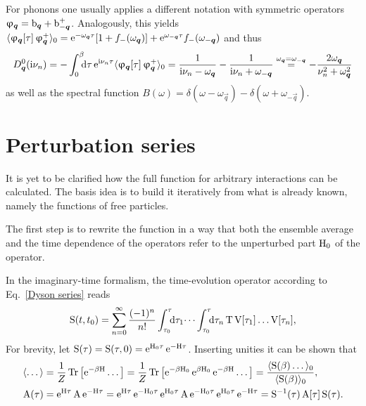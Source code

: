 For phonons one usually applies a different notation with symmetric operators
$\upvarphi_{\boldsymbol q} = \mathrm b_{\boldsymbol q} + \mathrm b_{-\boldsymbol q}^+$. Analogously, this yields
$\langle\upvarphi_{\boldsymbol q}[\tau] \, \upvarphi_{\boldsymbol q}^+\rangle_0 = \mathrm e^{-\omega_{\boldsymbol q} \tau}
[1 + f_-(\omega_{\boldsymbol q})] + \mathrm e^{\omega_{-\boldsymbol q} \tau} f_-(\omega_{-\boldsymbol q})$
and thus
%
\begin{equation} \label{D_0(i omega_n)}
    D_{\vec q}^0(\I \nu_n)
    = -\int \from 0 \till \beta \D \tau \, \E^{\I \nu_n \tau}
    \av{\upphi_{\vec q}[\tau] \, \upphi_{\vec q}^+}_0
    = \frac 1 {\I \nu_n - \omega_{\vec q}}
    - \frac 1 {\I \nu_n + \omega_{-\vec q}}
    \overset{\omega_{\vec q} = \omega_{-\vec q}} =
    -\frac{2 \omega_{\vec q}}{\nu_n^2 + \omega_{\vec q}^2}
\end{equation}
%
as well as the spectral function $B(\omega) = \delta(\omega - \omega_{\vec q}) -
\delta(\omega + \omega_{-\vec q})$.

\section{Perturbation series}

It is yet to be clarified how the full  function for arbitrary
interactions can be calculated. The basis idea is to build it iteratively from
what is already known, namely the  functions of free particles.

The first step is to rewrite the  function in a way that both the
ensemble average and the time dependence of the operators refer to the
unperturbed part $\mathrm H_0$ of the  operator.

In the imaginary-time formalism, the time-evolution operator according to
Eq.~\ref{Dyson series} reads
%
\begin{equation} \label{Matsubara-Dyson series}
    \op S(t, t_0) = \sum_{n = 0}^\infty \frac{(-1)^n}{n!}
    \int \from{\tau_0} \till \tau \D \tau_1 \dots
    \int \from{\tau_0} \till \tau \D \tau_n \,
    \op T \, \op V[\tau_1] \dots \op V[\tau_n],
\end{equation}
%
For brevity, let $\mathrm S(\tau) = \mathrm S(\tau, 0) = \mathrm e^{\mathrm H_0 \tau} \, \mathrm e^{-\mathrm H
\tau}$. Inserting unities it can be shown that
%
\begin{align*}
    \langle\dots\rangle &= \frac 1 Z \operatorname{Tr} \big[ \mathrm e^{-\beta \mathrm H} \dots \big]
    = \frac 1 Z \operatorname{Tr} \big[
        \mathrm e^{-\beta \mathrm H_0} \, \mathrm e^{\beta \mathrm H_0} \, \mathrm e^{-\beta \mathrm H} \dots
    \big]
    = \frac{\langle\mathrm S(\beta) \dots\rangle_0}{\langle\mathrm S(\beta)\rangle_0},
    \\
    \mathrm A(\tau) &= \mathrm e^{\mathrm H \tau} \, \mathrm A \, \mathrm e^{-\mathrm H \tau}
    = \mathrm e^{\mathrm H \tau} \, \mathrm e^{-\mathrm H_0 \tau} \,
    \mathrm e^{\mathrm H_0 \tau} \, \mathrm A \, \mathrm e^{-\mathrm H_0 \tau} \,
    \mathrm e^{\mathrm H_0 \tau} \, \mathrm e^{-\mathrm H \tau}
    = \mathrm S^{-1}(\tau) \, \mathrm A[\tau] \, \mathrm S(\tau).
\end{align*}

